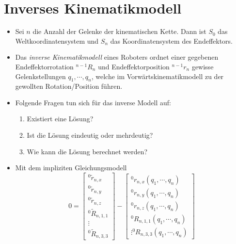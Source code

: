 \documentclass[a4paper, 11pt, accentcolor = tud3b]{tudreport}
\begin{document}
        \section{Inverses Kinematikmodell} %
	        \begin{itemize}
	        	\item Sei \( n \) die Anzahl der Gelenke der kinematischen Kette. Dann ist \( S _ 0 \) das Weltkoordinatensystem und \( S _ n \) das Koordinatensystem des Endeffektors.
	        	\item Das \textit{inverse Kinematikmodell} eines Roboters ordnet einer gegebenen Endeffektorrotation \( ^{n-1}R_n \) und Endeffektorposition \( ^{n-1}r_n \) gewisse Gelenkstellungen \( q _ 1, \cdots, q _ n \), welche im Vorwärtskinematikmodell zu der gewollten Rotation/Position führen.
	        	\item Folgende Fragen tun sich für das inverse Modell auf:
		        	\begin{enumerate}
		        		\item Existiert eine Lösung?
		        		\item Ist die Lösung eindeutig oder mehrdeutig?
		        		\item Wie kann die Lösung berechnet werden?
		        	\end{enumerate}
		        \item Mit dem impliziten Gleichungsmodell
			        \begin{equation*}
				        0 =
					        \begin{bmatrix}
						        ^0\tilde{r}_{n,x} \\
						        ^0\tilde{r}_{n,y} \\
						        ^0\tilde{r}_{n,z} \\
						        ^0\tilde{R}_{n,1,1} \\
						        \vdots \\
						        ^0\tilde{R}_{n,3,3}
					        \end{bmatrix}
					    -
						    \begin{bmatrix}
							    ^0r_{n,x}(q_1, \cdots, q_n) \\
							    ^0r_{n,y}(q_1, \cdots, q_n) \\
							    ^0r_{n,z}(q_1, \cdots, q_n) \\
							    ^0R_{n,1,1}(q_1, \cdots, q_n) \\
							    \vdots
							    ^0R_{n,3,3}(q_1, \cdots, q_n)
						    \end{bmatrix}

\end{equation*}
\end{itemize}
\end{document}
